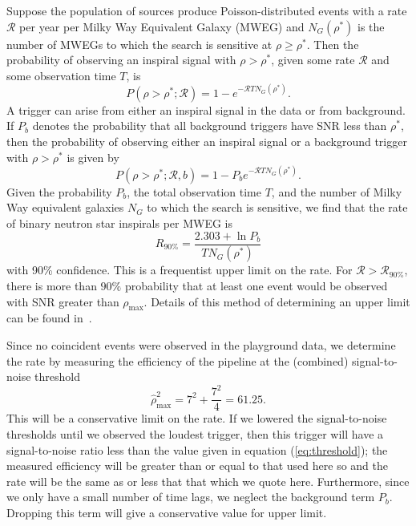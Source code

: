Suppose the population of sources produce Poisson-distributed events with a
rate $\mathcal{R}$ per year per Milky Way Equivalent Galaxy (MWEG) and
$N_G(\rho^\ast)$ is the number of MWEGs to which the search is sensitive at
$\rho \geq \rho^\ast$.   Then the probability of observing an inspiral signal
with $\rho > \rho^\ast$, given some rate $\mathcal{R}$ and some observation
time $T$, is
\begin{equation}
P(\rho>\rho^\ast;{\mathcal{R}}) = 1 - e^{-{\mathcal{R}}T N_G(\rho^\ast)}.
\label{eq:foreground-poisson}
\end{equation}
A trigger can arise from either an inspiral signal in the data or from
background.   If $P_b$ denotes the probability that all background triggers
have SNR less than $\rho^\ast$,  then the probability of observing either an
inspiral signal or a background trigger with $\rho > \rho^\ast$ is given by
\begin{equation}
P(\rho>\rho^\ast;{\mathcal{R}},b) = 1 - P_b e^{-{\mathcal{R}}TN_G(\rho^\ast)}.
\label{eq:joint-dist}
\end{equation}
Given the probability $P_b$, the total observation time $T$, and the number of
Milky Way equivalent galaxies $N_{{G}}$ to which the search is sensitive, we
find that the rate of binary neutron star inspirals per MWEG is
\begin{equation}
  R_{90\%} = \frac{2.303+\ln P_b}{T N_{G}(\rho^\ast)}
\end{equation}
with 90\% confidence. This is a frequentist upper limit on the rate.
For ${\mathcal{R}}>{\mathcal{R}}_{90\%}$, there is more than $90\%$
probability that at least one event would be observed with SNR greater
than $\rho_{\text{max}}$.   Details of this method of determining an 
upper limit can be found in~\cite{loudestGWDAW03}.

Since no coincident events were observed in the playground data, we determine
the rate by measuring the efficiency of the pipeline at the (combined)
signal-to-noise threshold
\begin{equation}
\hat{\rho}^2_\mathrm{max} =  7^2 + \frac{7^2}{4} = 61.25.
\label{eq:threshold}
\end{equation}
This will be a conservative limit on the rate. If we lowered the
signal-to-noise thresholds until we observed the loudest trigger, then this
trigger will have a signal-to-noise ratio less than the value given in equation
(\ref{eq:threshold}); the measured efficiency will be greater than or equal to
that used here so and the rate will be the same as or less that that which we
quote here. Furthermore, since we only have a small number of time lags, we
neglect the background term $P_b$. Dropping this term will give a conservative
value for upper limit.

